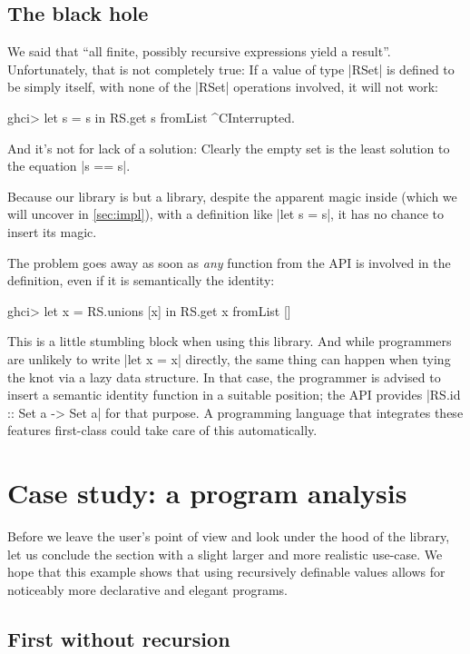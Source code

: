 \documentclass[manuscript,anonymous,screen,acmsmall]{acmart}
\begin{document}
\subsection{The black hole}\label{sec:blackhole}

We said that “all finite, possibly recursive expressions yield a result”. Unfortunately, that is not completely true: If a value of type |RSet| is defined to be simply itself, with none of the |RSet| operations involved, it will not work:
\begin{code}
ghci> let s = s in RS.get s
fromList ^CInterrupted.
\end{code}
And it’s not for lack of a solution: Clearly the empty set is the least solution to the equation |s == s|.

Because our library is but a library, despite the apparent magic inside (which we will uncover in \cref{sec:impl}), with a definition like |let s = s|, it has no chance to insert its magic.

The problem goes away as soon as \emph{any} function from the API is involved in the definition, even if it is semantically the identity:
\begin{code}
ghci> let x = RS.unions [x] in RS.get x
fromList []
\end{code}

This is a little stumbling block when using this library. And while programmers are unlikely to write |let x = x| directly, the same thing can happen when tying the knot via a lazy data structure. In that case, the programmer is advised to insert a semantic identity function in a suitable position; the API provides |RS.id :: Set a -> Set a| for that purpose.
A programming language that integrates these features first-class could take care of this automatically.

\section{Case study: a program analysis}\label{sec:casestudy}

Before we leave the user's point of view and look under the hood of the library, let us conclude the section with a slight larger and more realistic use-case. We hope that this example shows that using recursively definable values allows for noticeably more declarative and elegant programs.

\subsection{First without recursion}
\end{document}
